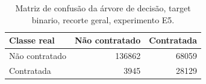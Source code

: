 \begin{table}
\caption{Matriz de confusão da árvore de decisão, target binario, recorte geral, experimento E5.}
\label{tab:matriz_confusao_treeClassification_19_profundidade_binario_recorte_geral_holdout_80_20_e5}
\begin{tabular}{lrr}
\toprule
Classe real & Não contratado & Contratada \\
\midrule
Não contratado & 136862 & 68059 \\
Contratada & 3945 & 28129 \\
\bottomrule
\end{tabular}
\end{table}
